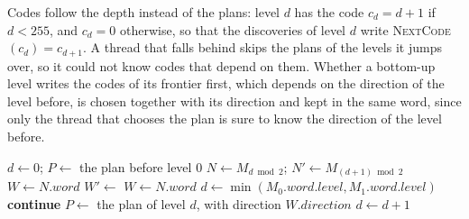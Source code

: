 Codes follow the depth instead of the plans: level $d$ has the code $c_d = d+1$ if $d < 255$, and $c_d = 0$ otherwise, so that the discoveries of level $d$ write \textsc{NextCode}$(c_d) = c_{d+1}$. A thread that falls behind skips the plans of the levels it jumps over, so it could not know codes that depend on them. Whether a bottom-up level writes the codes of its frontier first, which depends on the direction of the level before, is chosen together with its direction and kept in the same word, since only the thread that chooses the plan is sure to know the direction of the level before.

\begin{algorithm}
\caption{The levels of the variant with two nodes, $M_0$ and $M_1$, as thread $t$ runs them, and how it reads the work of other threads. A plan word $W$ holds a level, $W.\mathit{level}$, the direction chosen for it, $W.\mathit{direction}$, and whether the level writes the codes of its frontier first, $W.\mathit{codesFirst}$. In level $d$, $N = M_{d \bmod 2}$ and $N' = M_{(d+1) \bmod 2}$. In \textsc{Progress}, $f$ is $\mathit{last}$ or $\mathit{codesLast}$, and in \textsc{MarkDone}, $\mathit{done}$ or $\mathit{codesDone}$. Algorithms~\ref{alg:mem-expand} and~\ref{alg:mem-codes} expand the levels.}
\label{alg:mem}
\begin{algorithmic}[1]
    \State $d \gets 0$; $P \gets$ the plan before level $0$
    \Loop
        \State $N \gets M_{d \bmod 2}$; $N' \gets M_{(d+1) \bmod 2}$
        \State $W \gets N.\mathit{word}$
            \State $W' \gets$  
            \State {} \label{ln:mem-cas}
            \State $W \gets N.\mathit{word}$
        \EndIf
         
            \State $d \gets \min(M_0.\mathit{word}.\mathit{level}, M_1.\mathit{word}.\mathit{level})$ \label{ln:mem-jump}
            \State \textbf{continue}
        \EndIf
        \State $P \gets$ the plan of level $d$, with direction $W.\mathit{direction}$
        \State {} \label{ln:mem-start}
            \State {}
        \Else
            \State {}
        \EndIf
        \State $d \gets d+1$
    \EndLoop
\EndProcedure
\Statex
{}

\end{algorithmic}
\end{algorithm}
